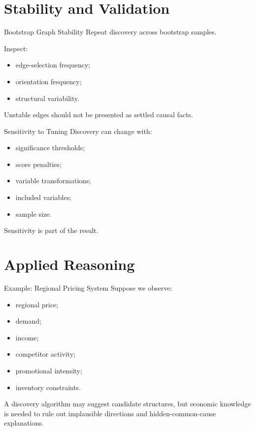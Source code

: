\documentclass[aspectratio=169,11pt]{beamer}
\begin{document}
\section{Stability and Validation}

\begin{frame}{Bootstrap Graph Stability}
Repeat discovery across bootstrap samples.

Inspect:
\begin{itemize}
\item edge-selection frequency;
\item orientation frequency;
\item structural variability.
\end{itemize}

Unstable edges should not be presented as settled causal facts.
\end{frame}

\begin{frame}{Sensitivity to Tuning}
Discovery can change with:
\begin{itemize}
\item significance thresholds;
\item score penalties;
\item variable transformations;
\item included variables;
\item sample size.
\end{itemize}

Sensitivity is part of the result.
\end{frame}

\section{Applied Reasoning}

\begin{frame}{Example: Regional Pricing System}
Suppose we observe:
\begin{itemize}
\item regional price;
\item demand;
\item income;
\item competitor activity;
\item promotional intensity;
\item inventory constraints.
\end{itemize}

A discovery algorithm may suggest candidate structures, but economic knowledge is needed to rule out implausible directions and hidden-common-cause explanations.
\end{frame}
\end{document}
